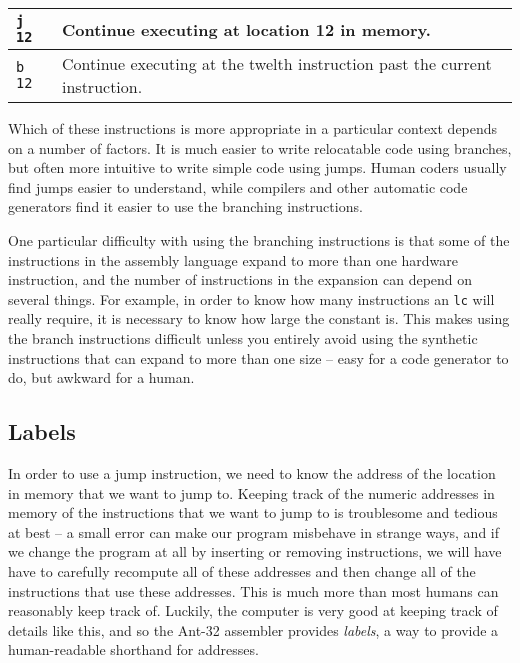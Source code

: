 \begin{center}
\begin{tabular}{|l|p{5.0in}|}
\hline
	{\tt j 12}	& Continue executing at location 12
			in memory. \\
\hline

	{\tt b 12}	& Continue executing at the twelth instruction
			past the current instruction. \\
\hline
\end{tabular}
\end{center}

Which of these instructions is more appropriate in a particular
context depends on a number of factors.  It is much easier to write
relocatable code using branches, but often more intuitive to write
simple code using jumps.  Human coders usually find jumps easier to
understand, while compilers and other automatic code generators find
it easier to use the branching instructions.

One particular difficulty with using the branching instructions is
that some of the instructions in the assembly language expand to more
than one hardware instruction, and the number of instructions in the
expansion can depend on several things.  For example, in order to know
how many instructions an {\tt lc} will really require, it is necessary
to know how large the constant is.  This makes using the branch
instructions difficult unless you entirely avoid using the synthetic
instructions that can expand to more than one size -- easy for a code
generator to do, but awkward for a human.
 
\subsection{Labels}
\label{Labels-subsec}

In order to use a jump instruction, we need to know the address of
the location in memory that we want to jump to.  Keeping track of
the numeric addresses in memory of the instructions that we want to
jump to is troublesome and tedious at best -- a small error can make
our program misbehave in strange ways, and if we change the program at
all by inserting or removing instructions, we will have have to
carefully recompute all of these addresses and then change all of the
instructions that use these addresses.  This is much more than most
humans can reasonably keep track of.  Luckily, the computer is very
good at keeping track of details like this, and so the Ant-32
assembler provides {\em labels}, a way to provide a human-readable
shorthand for addresses.

